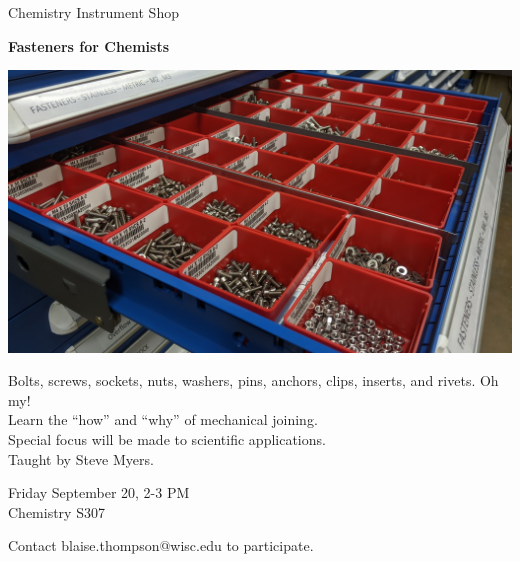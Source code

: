 \documentclass{article}
\begin{document}
\center

\Huge

Chemistry Instrument Shop

\textbf{
Fasteners for Chemists
}

\includegraphics[width=\linewidth]{coverart.jpg}

{
\huge
Bolts, screws, sockets, nuts, washers, pins, anchors, clips, inserts, and rivets.
Oh my! \\
Learn the ``how'' and ``why'' of mechanical joining. \\
Special focus will be made to scientific applications. \\
Taught by Steve Myers.
}

\vfill

{
\huge
Friday September 20, 2-3 PM \\
Chemistry S307
}

\vfill

{
\huge
Contact blaise.thompson@wisc.edu to participate.
}
\end{document}
